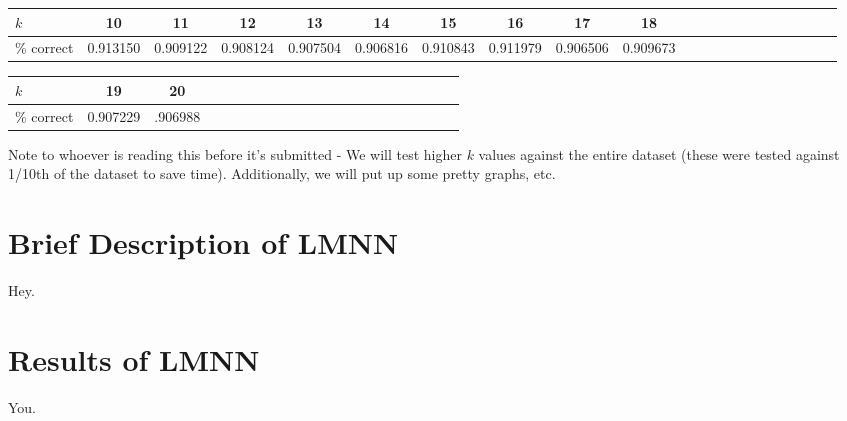 \documentclass[11pt]{article}
\begin{document}
\begin{flushleft}
  \begin{tabular}{ l | c | c | c | c | c | c | c | c | c | c | c | c | c | c | c | c | c | c | c | r }
    \hline
    $k$ & 10 & 11 & 12 & 13 & 14 & 15 & 16 & 17 & 18 \\ \hline
    \% correct & 0.913150 &  0.909122 & 0.908124 & 0.907504 & 0.906816 & 0.910843 & 0.911979 &  0.906506 & 0.909673 \\
    \hline
  \end{tabular}
\end{flushleft}

\begin{center}
  \begin{tabular}{ l | c | c | c | c | c | c | c | c | c | c | c | c | c | c | c | c | c | c | c | r }
    \hline
    $k$ & 19 & 20 \\ \hline
    \% correct  & 0.907229 & .906988 \\
    \hline
  \end{tabular}
\end{center}
Note to whoever is reading this before it's submitted - We will test higher $k$ values against the entire dataset (these were tested against 1/10th of the dataset to save time). Additionally, we will put up some pretty graphs, etc.
\section{Brief Description of LMNN}
Hey.
\section{Results of LMNN}
You.
\end{document}
